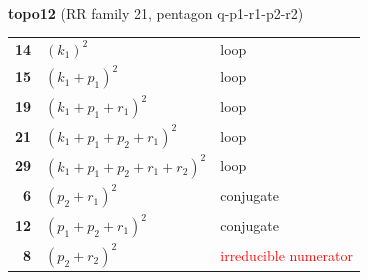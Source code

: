 \documentclass[10pt]{article}
\begin{document}
\begin{minipage}[t]{0.48\textwidth}
{}\\[2mm]\textbf{topo12} (RR family 21, pentagon q-p1-r1-p2-r2)\\[2pt]{\footnotesize\begin{tabular}{@{}r@{\ \ }l@{\ \ }l@{}}\textbf{14} & $(k_1)^2$ & loop\\
\textbf{15} & $(k_1+p_1)^2$ & loop\\
\textbf{19} & $(k_1+p_1+r_1)^2$ & loop\\
\textbf{21} & $(k_1+p_1+p_2+r_1)^2$ & loop\\
\textbf{29} & $(k_1+p_1+p_2+r_1+r_2)^2$ & loop\\
\textbf{6} & $(p_2+r_1)^2$ & conjugate\\
\textbf{12} & $(p_1+p_2+r_1)^2$ & conjugate\\
\textbf{8} & $(p_2+r_2)^2$ & \textcolor{red}{irreducible numerator}\\\end{tabular}}\end{minipage}

\bigskip
\end{document}
